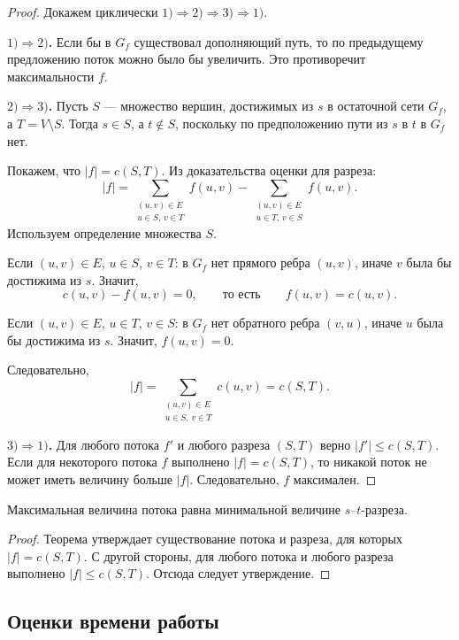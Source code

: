 \begin{proof}
	Докажем циклически $1)\Rightarrow 2)\Rightarrow 3)\Rightarrow 1)$.
	
	\textbf{$1)\Rightarrow 2)$.}
	Если бы в $G_f$ существовал дополняющий путь, то по предыдущему предложению поток можно было бы увеличить. Это противоречит максимальности $f$.
	
	\textbf{$2)\Rightarrow 3)$.}
	Пусть $S$ --- множество вершин, достижимых из $s$ в остаточной сети $G_f$, а $T=V\setminus S$. Тогда $s\in S$, а $t\notin S$, поскольку по предположению пути из $s$ в $t$ в $G_f$ нет.
	
	Покажем, что $|f|=c(S,T)$. Из доказательства оценки для разреза:
	\[
	|f|=
	\sum_{\substack{(u,v)\in E\\ u\in S,\, v\in T}} f(u,v)
	-
	\sum_{\substack{(u,v)\in E\\ u\in T,\, v\in S}} f(u,v).
	\]
	Используем определение множества $S$.
	
	Если $(u,v)\in E$, $u\in S$, $v\in T$: в $G_f$ нет прямого ребра $(u,v)$, иначе $v$ была бы достижима из $s$. Значит,
	\[
	c(u,v)-f(u,v)=0, \qquad\text{то есть}\qquad f(u,v)=c(u,v).
	\]
	
	Если $(u,v)\in E$, $u\in T$, $v\in S$: в $G_f$ нет обратного ребра $(v,u)$, иначе $u$ была бы достижима из $s$. Значит, $f(u,v)=0$.
	
	Следовательно,
	\[
	|f|=
	\sum_{\substack{(u,v)\in E\\ u\in S,\, v\in T}} c(u,v)
	=c(S,T).
	\]
	
	\textbf{$3)\Rightarrow 1)$.}
	Для любого потока $f'$ и любого разреза $(S,T)$ верно $|f'|\le c(S,T)$. Если для некоторого потока $f$ выполнено $|f|=c(S,T)$, то никакой поток не может иметь величину больше $|f|$. Следовательно, $f$ максимален.
\end{proof}

\begin{Proposition}{}{}
	Максимальная величина потока равна минимальной величине $s$--$t$-разреза.
\end{Proposition}

\begin{proof}
	Теорема утверждает существование потока и разреза, для которых $|f|=c(S,T)$. С другой стороны, для любого потока и любого разреза выполнено $|f|\le c(S,T)$. Отсюда следует утверждение.
\end{proof}

\subsection{Оценки времени работы}

